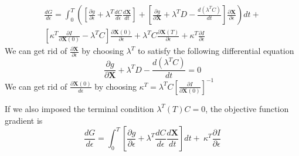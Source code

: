 \documentclass{tufte-handout}
\begin{document}
 \begin{multline}\label{lag_gradd}
 \frac{d G}{d\epsilon} = \int_{0}^{T} \left(  \left[  \frac{\partial g}{\partial \epsilon} + \lambda^T \frac{d C}{d \epsilon} \frac{d \mathbf{X}}{dt}  \right] +\left[  \frac{\partial g}{\partial \mathbf{X}}  + \lambda^T  D - \frac{ d\left(  \lambda^T C \right) }{dt}  \right]  \frac{\partial \mathbf{X}}{\partial \epsilon} \right)  dt +  \\      \left[ \kappa^T \frac{\partial I}{\partial \mathbf{X}(0)}  -\lambda^T C   \right]  \frac{\partial \mathbf{X}(0)}{\partial \epsilon} + \lambda^T C \frac{\partial \mathbf{X}(T)}{\partial \epsilon} + \kappa^T \frac{\partial I}{\partial \epsilon}
 \end{multline}
 We can get rid of $\frac{\partial \mathbf{X}}{\partial\epsilon}$  by choosing $\lambda^T$ to satisfy the following differential equation
\begin{equation}
 \frac{\partial g}{\partial \mathbf{X}}  + \lambda^T  D - \frac{ d\left(  \lambda^T C \right) }{dt} = 0
\end{equation}
We can get rid of  $\frac{\partial \mathbf{X}(0)}{d\epsilon}$  by choosing $\kappa^T = \lambda^T C \left[  \frac{\partial I}{\partial \mathbf{X}(0)}\right] ^{-1} $

If we also imposed the terminal condition $\lambda^T(T) C = 0$, the objective function gradient is 
 \begin{equation}\label{lag_graddd}
 \frac{d G}{d\epsilon} = \int_{0}^{T} \left[  \frac{\partial g}{\partial \epsilon} + \lambda^T \frac{d C}{d \epsilon} \frac{d \mathbf{X}}{dt}  \right] dt + \ \kappa^T \frac{\partial I}{\partial \epsilon}
 \end{equation}
\end{document}

